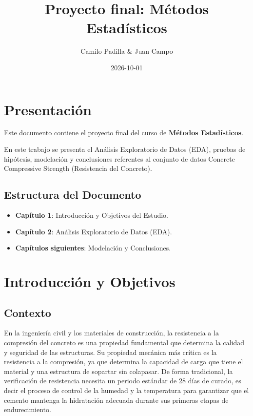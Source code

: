 \documentclass[
]{book}
\title{Proyecto final: Métodos Estadísticos}
\author{Camilo Padilla \& Juan Campo}
\date{2026-10-01}
\providecommand{\tightlist}{%
  \setlength{\itemsep}{0pt}\setlength{\parskip}{0pt}}
\begin{document}
\maketitle

{
\setcounter{tocdepth}{1}
\tableofcontents
}
\chapter{Presentación}\label{presentaciuxf3n}

Este documento contiene el proyecto final del curso de \textbf{Métodos Estadísticos}.

En este trabajo se presenta el Análisis Exploratorio de Datos (EDA), pruebas de hipótesis, modelación y conclusiones referentes al conjunto de datos Concrete Compressive Strength (Resistencia del Concreto).

\section{Estructura del Documento}\label{estructura-del-documento}

\begin{itemize}
\tightlist
\item
  \textbf{Capítulo 1}: Introducción y Objetivos del Estudio.
\item
  \textbf{Capítulo 2}: Análisis Exploratorio de Datos (EDA).
\item
  \textbf{Capítulos siguientes}: Modelación y Conclusiones.
\end{itemize}

\chapter{Introducción y Objetivos}\label{intro}

\section{Contexto}\label{contexto}

En la ingeniería civil y los materiales de construcción, la resistencia a la compresión del concreto es una propiedad fundamental que determina la calidad y seguridad de las estructuras. Su propiedad mecánica más crítica es la resistencia a la compresión, ya que determina la capacidad de carga que tiene el material y una estructura de sopartar sin colapasar. De forma tradicional, la verificación de resistencia necesita un periodo estándar de 28 días de curado, es decir el proceso de control de la humedad y la temperatura para garantizar que el cemento mantenga la hidratación adecuada durante sus primeras etapas de endurecimiento.
\end{document}
